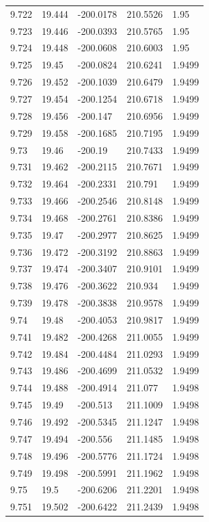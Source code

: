 \begin{tabular}{lllll}
9.722 & 19.444 & -200.0178 & 210.5526 & 1.95 \\
9.723 & 19.446 & -200.0393 & 210.5765 & 1.95 \\
9.724 & 19.448 & -200.0608 & 210.6003 & 1.95 \\
9.725 & 19.45 & -200.0824 & 210.6241 & 1.9499 \\
9.726 & 19.452 & -200.1039 & 210.6479 & 1.9499 \\
9.727 & 19.454 & -200.1254 & 210.6718 & 1.9499 \\
9.728 & 19.456 & -200.147 & 210.6956 & 1.9499 \\
9.729 & 19.458 & -200.1685 & 210.7195 & 1.9499 \\
9.73 & 19.46 & -200.19 & 210.7433 & 1.9499 \\
9.731 & 19.462 & -200.2115 & 210.7671 & 1.9499 \\
9.732 & 19.464 & -200.2331 & 210.791 & 1.9499 \\
9.733 & 19.466 & -200.2546 & 210.8148 & 1.9499 \\
9.734 & 19.468 & -200.2761 & 210.8386 & 1.9499 \\
9.735 & 19.47 & -200.2977 & 210.8625 & 1.9499 \\
9.736 & 19.472 & -200.3192 & 210.8863 & 1.9499 \\
9.737 & 19.474 & -200.3407 & 210.9101 & 1.9499 \\
9.738 & 19.476 & -200.3622 & 210.934 & 1.9499 \\
9.739 & 19.478 & -200.3838 & 210.9578 & 1.9499 \\
9.74 & 19.48 & -200.4053 & 210.9817 & 1.9499 \\
9.741 & 19.482 & -200.4268 & 211.0055 & 1.9499 \\
9.742 & 19.484 & -200.4484 & 211.0293 & 1.9499 \\
9.743 & 19.486 & -200.4699 & 211.0532 & 1.9499 \\
9.744 & 19.488 & -200.4914 & 211.077 & 1.9498 \\
9.745 & 19.49 & -200.513 & 211.1009 & 1.9498 \\
9.746 & 19.492 & -200.5345 & 211.1247 & 1.9498 \\
9.747 & 19.494 & -200.556 & 211.1485 & 1.9498 \\
9.748 & 19.496 & -200.5776 & 211.1724 & 1.9498 \\
9.749 & 19.498 & -200.5991 & 211.1962 & 1.9498 \\
9.75 & 19.5 & -200.6206 & 211.2201 & 1.9498 \\
9.751 & 19.502 & -200.6422 & 211.2439 & 1.9498 \\

\end{tabular}
